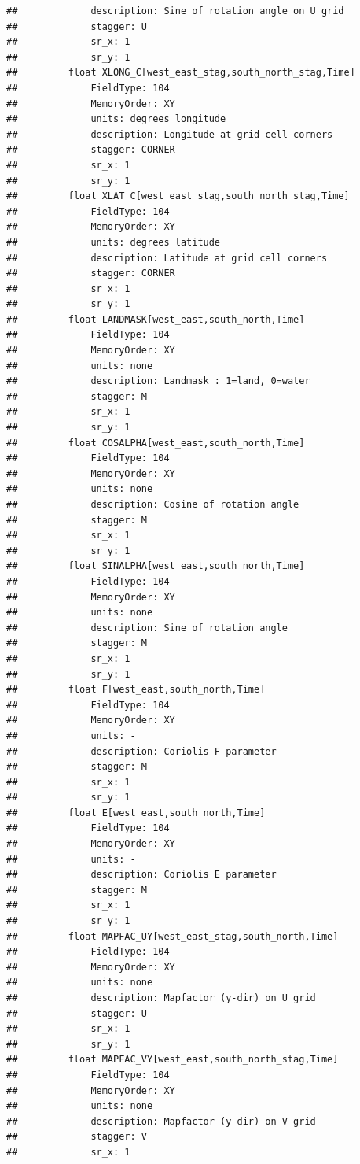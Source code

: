 \documentclass[]{book}
\begin{document}
\begin{verbatim}
##             description: Sine of rotation angle on U grid
##             stagger: U
##             sr_x: 1
##             sr_y: 1
##         float XLONG_C[west_east_stag,south_north_stag,Time]   
##             FieldType: 104
##             MemoryOrder: XY 
##             units: degrees longitude
##             description: Longitude at grid cell corners
##             stagger: CORNER
##             sr_x: 1
##             sr_y: 1
##         float XLAT_C[west_east_stag,south_north_stag,Time]   
##             FieldType: 104
##             MemoryOrder: XY 
##             units: degrees latitude
##             description: Latitude at grid cell corners
##             stagger: CORNER
##             sr_x: 1
##             sr_y: 1
##         float LANDMASK[west_east,south_north,Time]   
##             FieldType: 104
##             MemoryOrder: XY 
##             units: none
##             description: Landmask : 1=land, 0=water
##             stagger: M
##             sr_x: 1
##             sr_y: 1
##         float COSALPHA[west_east,south_north,Time]   
##             FieldType: 104
##             MemoryOrder: XY 
##             units: none
##             description: Cosine of rotation angle
##             stagger: M
##             sr_x: 1
##             sr_y: 1
##         float SINALPHA[west_east,south_north,Time]   
##             FieldType: 104
##             MemoryOrder: XY 
##             units: none
##             description: Sine of rotation angle
##             stagger: M
##             sr_x: 1
##             sr_y: 1
##         float F[west_east,south_north,Time]   
##             FieldType: 104
##             MemoryOrder: XY 
##             units: -
##             description: Coriolis F parameter
##             stagger: M
##             sr_x: 1
##             sr_y: 1
##         float E[west_east,south_north,Time]   
##             FieldType: 104
##             MemoryOrder: XY 
##             units: -
##             description: Coriolis E parameter
##             stagger: M
##             sr_x: 1
##             sr_y: 1
##         float MAPFAC_UY[west_east_stag,south_north,Time]   
##             FieldType: 104
##             MemoryOrder: XY 
##             units: none
##             description: Mapfactor (y-dir) on U grid
##             stagger: U
##             sr_x: 1
##             sr_y: 1
##         float MAPFAC_VY[west_east,south_north_stag,Time]   
##             FieldType: 104
##             MemoryOrder: XY 
##             units: none
##             description: Mapfactor (y-dir) on V grid
##             stagger: V
##             sr_x: 1

\end{verbatim}
\end{document}
